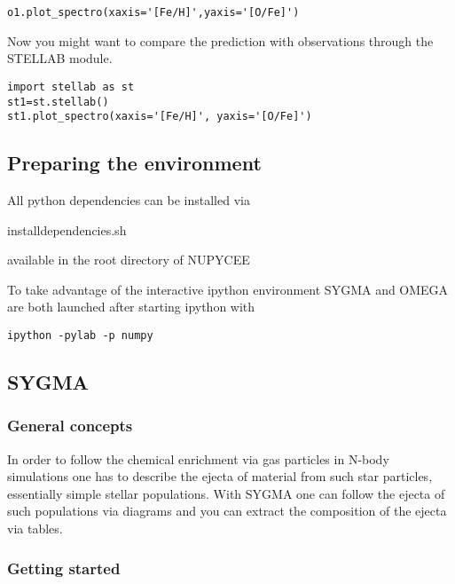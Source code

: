 \begin{verbatim}
o1.plot_spectro(xaxis='[Fe/H]',yaxis='[O/Fe]')
\end{verbatim}

Now you might want to compare the prediction with
observations through the STELLAB module.

\begin{verbatim}
import stellab as st
st1=st.stellab()
st1.plot_spectro(xaxis='[Fe/H]', yaxis='[O/Fe]')
\end{verbatim}





\subsection{Preparing the environment}%


All python dependencies can be installed via 

install\textunderscore dependencies.sh 

available in the root directory of NUPYCEE

To take advantage of the interactive ipython environment 
SYGMA and OMEGA are both launched after starting
ipython with

\begin{verbatim}
ipython -pylab -p numpy
\end{verbatim}



\subsection{SYGMA}

\subsubsection{General concepts}

In order to follow the chemical enrichment via gas particles
in N-body simulations one has to describe the ejecta of material
from such star particles, essentially simple stellar populations. 
With SYGMA one can follow the ejecta of such populations via
diagrams and you can extract the composition of the ejecta via tables.


\subsubsection{Getting started}

